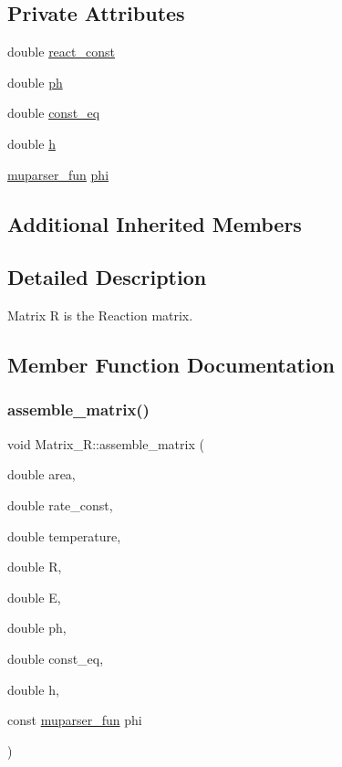 \subsection*{Private Attributes}
\begin{DoxyCompactItemize}
\item 
double \hyperlink{classMatrix__R_af2872298a4ebd9ac7493a1f55e3fa586}{react\+\_\+const}
\item 
double \hyperlink{classMatrix__R_ae8345433c06d0d0249c09783c4ff80bc}{ph}
\item 
double \hyperlink{classMatrix__R_ab5ca8aff010e279569065f76d28c4437}{const\+\_\+eq}
\item 
double \hyperlink{classMatrix__R_ac5bb79872f4324d89760f8047a1e63a4}{h}
\item 
\hyperlink{classmuparser__fun}{muparser\+\_\+fun} \hyperlink{classMatrix__R_a8527ebc8844931d65e65c168956398ff}{phi}
\end{DoxyCompactItemize}
\subsection*{Additional Inherited Members}


\subsection{Detailed Description}
Matrix R is the Reaction matrix. 

\subsection{Member Function Documentation}
\mbox{\label{classMatrix__R_a09330cb1b8c809a4a29364c5f7b101b6}} 
\subsubsection{\texorpdfstring{assemble\+\_\+matrix()}{assemble\_matrix()}}
{\footnotesize\ttfamily void Matrix\+\_\+\+R\+::assemble\+\_\+matrix (\begin{DoxyParamCaption}\item[{double}]{area,  }\item[{double}]{rate\+\_\+const,  }\item[{double}]{temperature,  }\item[{double}]{R,  }\item[{double}]{E,  }\item[{double}]{ph,  }\item[{double}]{const\+\_\+eq,  }\item[{double}]{h,  }\item[{const \hyperlink{classmuparser__fun}{muparser\+\_\+fun}}]{phi }\end{DoxyParamCaption})}

